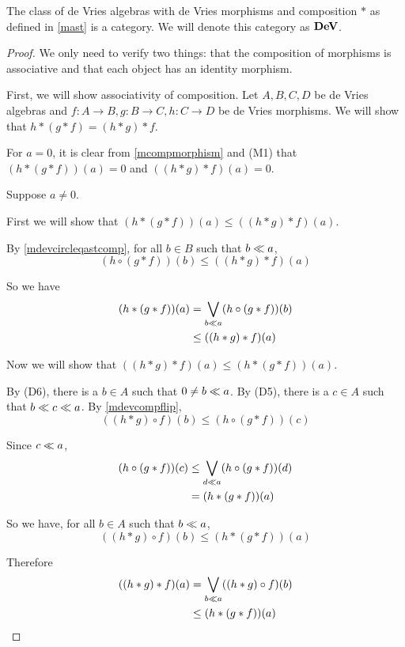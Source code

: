 \begin{theorem}
	The class of de Vries algebras with de Vries morphisms and composition \( \ast \) as defined in \ref{mast} is a category.  We will denote this category as \( \bf{DeV} \).
\end{theorem}
\begin{proof}
	We only need to verify two things: that the composition of morphisms is associative and that each object has an identity morphism.

	First, we will show associativity of composition.  Let \( A,B,C,D \) be de Vries algebras and \( f:A \to B, g:B \to C, h:C \to D \) be de Vries morphisms.  We will show that \( h \ast (g \ast f) = (h \ast g) \ast f \).
	
	For \( a = 0 \), it is clear from \ref{mcompmorphism} and (M1) that \( (h \ast (g \ast f))(a) = 0 \) and \( ((h \ast g) \ast f)(a) = 0 \).
	
	Suppose \( a \neq 0 \).
	
	First we will show that \( (h \ast (g \ast f))(a) \leq ((h \ast g) \ast f)(a) \).

	By \ref{mdevcircleqastcomp}, for all \( b \in B \) such that \( b \ll a \),
	\[ (h \circ (g \ast f))(b) \leq ((h \ast g) \ast f)(a) \]
	
	So we have
	\begin{align*}
		(h \ast (g \ast f))(a) &= \bigvee_{b \ll a} (h \circ (g \ast f))(b)\\
		&\leq ((h \ast g) \ast f)(a)
	\end{align*}

	Now we will show that \( ((h \ast g) \ast f)(a) \leq (h \ast (g \ast f))(a) \).
	
	By (D6), there is a \( b \in A \) such that \( 0 \neq b \ll a \).  By (D5), there is a \( c \in A \) such that \( b \ll c \ll a \).  By \ref{mdevcompflip},
	\[ ((h \ast g) \circ f)(b) \leq (h \circ (g \ast f))(c) \]
	
	Since \( c \ll a \),
	\begin{align*}
		(h \circ(g \ast f))(c) &\leq \bigvee_{d \ll a} (h \circ (g \ast f))(d) \\
		&= (h \ast (g \ast f))(a)
	\end{align*}
	
	So we have, for all \( b \in A \) such that \( b \ll a \),
	\[ ((h \ast g) \circ f)(b) \leq (h \ast (g \ast f))(a) \]
	
	Therefore
	\begin{align*}
		((h \ast g) \ast f)(a) &= \bigvee_{b \ll a} ((h \ast g) \circ f)(b) \\
		&\leq (h \ast (g \ast f))(a)
	\end{align*}
	

\end{proof}
